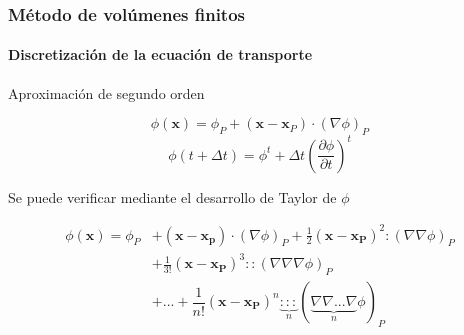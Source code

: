 \begin{frame}
    \frametitle{M\'etodo de vol\'umenes finitos}
    \framesubtitle{Discretizaci\'on de la ecuaci\'on de transporte}

    Aproximaci\'on de segundo orden

    $$   \phi(\mathbf{x}) = \phi_P + (\mathbf{x} - \mathbf{x}_P) \cdot (\nabla \phi)_P  $$
    $$   \phi (t + \Delta t) = \phi^t + \Delta t (\frac{\partial \phi}{\partial t})^t  $$




    Se puede verificar mediante el desarrollo de Taylor de $\phi$

    \begin{align*}
      \phi(\boldsymbol{x}) = \phi_P &+ (\boldsymbol{x} - \boldsymbol{x_p}) \cdot (\nabla \phi)_P + \frac{1}{2}(\boldsymbol{x} - \boldsymbol{x_P})^2 :(\nabla \nabla \phi)_P  \\ 
      & + \frac{1}{3!}(\boldsymbol{x} - \boldsymbol{x_P})^3 ::(\nabla \nabla \nabla \phi)_P \\
      & + ... + \dfrac{1}{n!}(\boldsymbol{x} - \boldsymbol{x_P})^n \underbrace{:::}_n (\underbrace{\nabla \nabla ... \nabla}_n \phi)_P
    \end{align*}
    
    
    
    



\end{frame}
